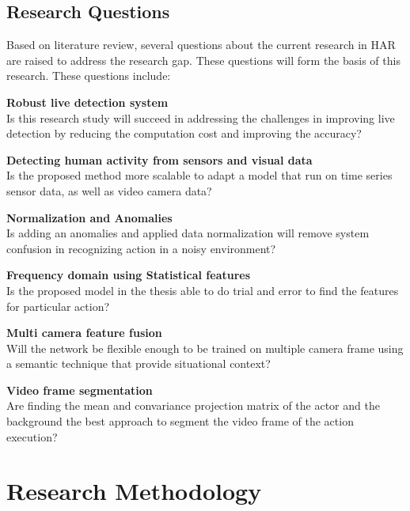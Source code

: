 \subsection{Research Questions}
\hspace{5mm} Based on literature review, several questions about the current research in HAR are raised to address the research gap. These questions will form the basis of this research. These questions include:\\
\begin{description}
    \item \textbf{Robust live detection system}\hfill \\
    Is this research study will succeed in addressing the challenges in improving live detection by reducing the computation cost and improving the accuracy?
   
    \item \textbf{Detecting human activity from sensors and visual data}\hfill \\
    Is the proposed method more scalable to adapt a model that run on time series sensor data, as well as video camera data? 

    \item \textbf{Normalization and Anomalies}\hfill \\
    Is adding an anomalies and applied data normalization will remove system confusion in recognizing action in a noisy environment?
    
    \item \textbf{Frequency domain using Statistical features}\hfill \\
    Is the proposed model in the thesis able to do trial and error to find the features for particular action?
    
    \item \textbf{Multi camera feature fusion} \hfill \\
    Will the network be flexible enough to be trained on multiple camera frame using a semantic technique that provide situational context?
    
    \item \textbf{Video frame segmentation}\hfill \\
    Are finding the mean and convariance projection matrix of the actor and the background the best approach to segment the video frame of the action execution?
    
\end{description}

\section{Research Methodology}
